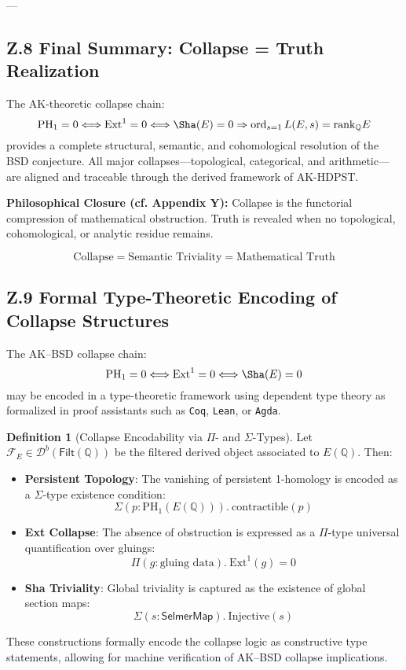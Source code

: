 \documentclass[11pt]{article}
\theoremstyle{definition}
\newtheorem{definition}[theorem]{Definition}
\begin{document}
---

\subsection*{Z.8 Final Summary: Collapse = Truth Realization}

The AK-theoretic collapse chain:
\[
\mathrm{PH}_1 = 0 \Longleftrightarrow \mathrm{Ext}^1 = 0 \Longleftrightarrow \Sha(E) = 0 \Rightarrow \operatorname{ord}_{s=1} L(E,s) = \mathrm{rank}_\mathbb{Q} E
\]
provides a complete structural, semantic, and cohomological resolution of the BSD conjecture.  
All major collapses—topological, categorical, and arithmetic—are aligned and traceable through the derived framework of AK-HDPST.

\textbf{Philosophical Closure (cf. Appendix Y):}  
Collapse is the functorial compression of mathematical obstruction.  
Truth is revealed when no topological, cohomological, or analytic residue remains.

\[
\text{Collapse} = \text{Semantic Triviality} = \text{Mathematical Truth}
\]


\subsection*{Z.9 Formal Type-Theoretic Encoding of Collapse Structures}

The AK–BSD collapse chain:
\[
\mathrm{PH}_1 = 0 \Longleftrightarrow \mathrm{Ext}^1 = 0 \Longleftrightarrow \Sha(E) = 0
\]
may be encoded in a type-theoretic framework using dependent type theory as formalized in proof assistants such as \texttt{Coq}, \texttt{Lean}, or \texttt{Agda}.

\begin{definition}[Collapse Encodability via \texorpdfstring{$\Pi$}{Pi}- and \texorpdfstring{$\Sigma$}{Sigma}-Types]
Let \( \mathcal{F}_E \in \mathcal{D}^b(\mathsf{Filt}(\mathbb{Q})) \) be the filtered derived object associated to \( E(\mathbb{Q}) \). Then:

\begin{itemize}
  \item \textbf{Persistent Topology}:  
  The vanishing of persistent 1-homology is encoded as a $\Sigma$-type existence condition:
  \[
  \Sigma(p : \mathrm{PH}_1(E(\mathbb{Q}))).\ \text{contractible}(p)
  \]

  \item \textbf{Ext Collapse}:  
  The absence of obstruction is expressed as a $\Pi$-type universal quantification over gluings:
  \[
  \Pi(g : \text{gluing data}).\ \text{Ext}^1(g) = 0
  \]

  \item \textbf{Sha Triviality}:  
  Global triviality is captured as the existence of global section maps:
  \[
  \Sigma(s : \mathsf{SelmerMap}).\ \text{Injective}(s)
  \]
\end{itemize}

These constructions formally encode the collapse logic as constructive type statements, allowing for machine verification of AK–BSD collapse implications.
\end{definition}
\end{document}
